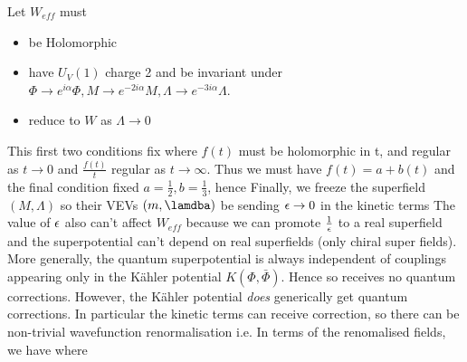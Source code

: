 \documentclass{article}
\begin{document}

Let 
$W_{eff}$ must  
\begin{itemize}
    \item be Holomorphic 
    \item have $U_V(1)$ charge 2 and be invariant under $\Phi \to e^{i\alpha}\Phi, M \to e^{-2i\alpha}M, \Lambda \to e^{-3i\alpha}\Lambda$.
    \item reduce to $W$ as $\Lambda \to 0$
\end{itemize}
This first two conditions fix 
where $f(t)$ must be holomorphic in t, and regular as $t \to 0$ and $\frac{f(t)}{t}$ regular as $t \to \infty$. Thus we must have $f(t) = a+b(t)$ and the final condition fixed $a=\frac{1}{2}, b = \frac{1}{3}$, hence 
Finally, we freeze the superfield $(M,\Lambda)$ so their VEVs $(m,\lamdba)$ be sending $\epsilon \to 0$ in the kinetic terms 
The value of $\epsilon$ also can't affect $W_{eff}$ because we can promote $\frac{1}{\epsilon}$ to a real superfield and the superpotential can't depend on real superfields (only chiral super fields). More generally, the quantum superpotential is always independent of couplings appearing only in the K\"ahler potential $K(\Phi,\bar{\Phi})$. Hence 
so receives no quantum corrections. However, the K\"ahler potential \emph{does} generically get quantum corrections. In particular the kinetic terms can receive correction, so there can be non-trivial wavefunction renormalisation 
i.e. 
In terms of the renomalised fields, we have
where 


\end{document}
